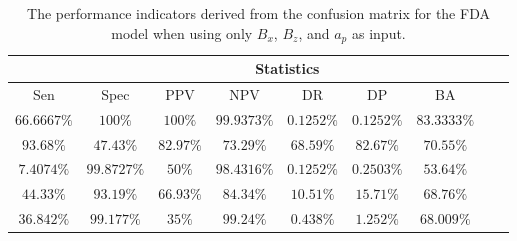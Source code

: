 \begin{table}[!ht]
	\centering
	\begin{tabular}{|c|c|c|c|c|c|c|c|c|}
		\hline
		 & \multicolumn{7}{c|}{Statistics} \\ \hline
		Sen & Spec & PPV & NPV & DR & DP & BA \\ \hline
		$66.6667\%$ & $100\%$ & $100\%$ & $99.9373\%$ & $0.1252\%$ & $0.1252\%$ & $83.3333\%$ \\ \hline
		$93.68\%$ & $47.43\%$ & $82.97\%$ & $73.29\%$ & $68.59\%$ & $82.67\%$ & $70.55\%$ \\ \hline
		$7.4074\%$ & $99.8727\%$ & $50\%$ & $98.4316\%$ & $0.1252\%$ & $0.2503\%$ & $53.64\%$ \\ \hline
		$44.33\%$ & $93.19\%$ & $66.93\%$ & $84.34\%$ & $10.51\%$ & $15.71\%$ & $68.76\%$ \\ \hline
		$36.842\%$ & $99.177\%$ & $35\%$ & $99.24\%$ & $0.438\%$ & $1.252\%$ & $68.009\%$ \\ \hline
	\end{tabular}
	\caption{The performance indicators derived from the confusion matrix for the FDA model when using only $B_{x}$, $B_{z}$, and $a_{p}$ as input.}
	\label{tab:cs:xzap:fda}
\end{table}
